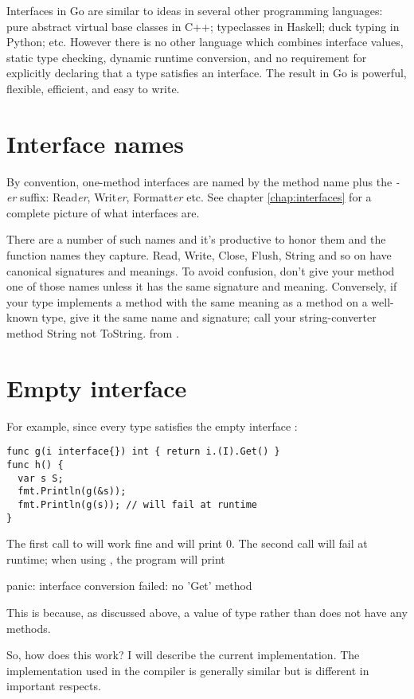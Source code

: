 Interfaces in Go are similar to ideas in several other programming languages:
pure abstract virtual base classes in C++; typeclasses in Haskell; duck typing
in Python; etc. However there is no other language which combines
interface values, static type checking, dynamic runtime conversion, and no
requirement for explicitly declaring that a type satisfies an interface. The
result in Go is powerful, flexible, efficient, and easy to write.

\section{Interface names}
By convention, one-method interfaces are named by the method name plus
the \emph{-er} suffix: Read\emph{er}, Writ\emph{er}, Formatt\emph{er} etc. See chapter
\ref{chap:interfaces} for a complete picture of what interfaces are.

There are a number of such names and it's productive to honor them and
the function names they capture. Read, Write, Close, Flush, String and
so on have canonical signatures and meanings. To avoid confusion, don't
give your method one of those names unless it has the same signature and
meaning. Conversely, if your type implements a method with the same
meaning as a method on a well-known type, give it the same name and
signature; call your string-converter method String not ToString.
from \cite{effective_go}.


\section{Empty interface}
For example, since every type satisfies the empty interface
:
\begin{lstlisting}
func g(i interface{}) int { return i.(I).Get() }
func h() {
  var s S;
  fmt.Println(g(&s));
  fmt.Println(g(s)); // will fail at runtime
}
\end{lstlisting}
The first call to  will work fine and will print 0. The second call will fail
at runtime; when using , the program will print
\begin{display}
panic: interface conversion failed: no 'Get' method
\end{display}
This is because, as discussed above, a value of type  rather than  
does not have any methods.

So, how does this work? I will describe the current  implementation. The
implementation used in the  compiler is generally similar but is different
in important respects.

